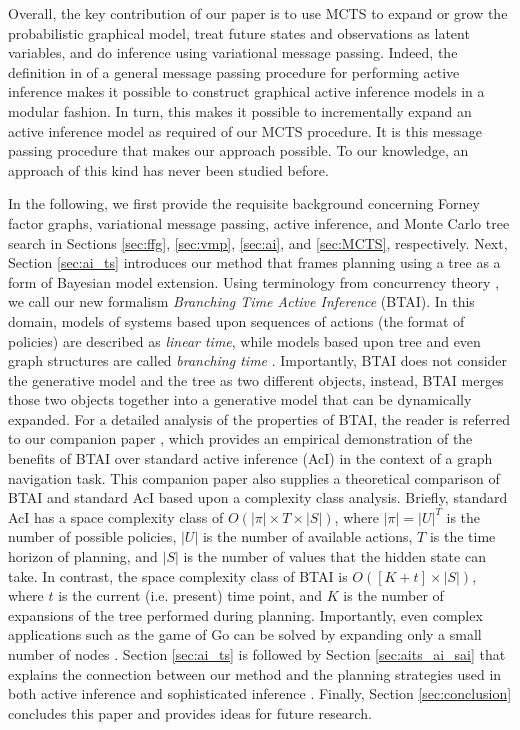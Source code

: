 \documentclass[twoside,11pt]{article}
\begin{document}
Overall, the key contribution of our paper is to use MCTS to expand or grow the probabilistic graphical model, treat future states and observations as latent variables, and do inference using variational message passing. Indeed, the definition in \citep{AI_VMP} of a general message passing procedure for performing active inference makes it possible to construct graphical active inference models in a modular fashion. In turn, this makes it possible to incrementally expand an active inference model as required of our MCTS procedure. It is this message passing procedure that makes our approach possible. To our knowledge, an approach of this kind has never been studied before.

In the following, we first provide the requisite background concerning Forney factor graphs, variational message passing, active inference, and Monte Carlo tree search in Sections \ref{sec:ffg}, \ref{sec:vmp}, \ref{sec:ai}, and \ref{sec:MCTS}, respectively. Next, Section \ref{sec:ai_ts} introduces our method that frames planning using a tree as a form of Bayesian model extension. Using terminology from concurrency theory \citep{concurrency_howard}, we call our new formalism \textit{Branching Time Active Inference} (BTAI). In this domain, models of systems based upon sequences of actions (the format of policies) are described as \textit{linear time}, while models based upon tree and even graph structures are called \textit{branching time} \citep{concurrency_glabbeek,concurrency_glabbeek_2,concurrency_howard}. Importantly, BTAI does not consider the generative model and the tree as two different objects, instead, BTAI merges those two objects together into a generative model that can be dynamically expanded. For a detailed analysis of the properties of BTAI, the reader is referred to our companion paper \citep{AITS_PRACTICE}, which provides an empirical demonstration of the benefits of BTAI over standard active inference (AcI) in the context of a graph navigation task. This companion paper also supplies a theoretical comparison of BTAI and standard AcI based upon a complexity class analysis. Briefly, standard AcI has a space complexity class of $O(|\pi| \times T \times |S|)$, where $|\pi| = |U|^T$ is the number of possible policies, $|U|$ is the number of available actions, $T$ is the time horizon of planning, and $|S|$ is the number of values that the hidden state can take. In contrast, the space complexity class of BTAI is $O([K + t] \times |S|)$, where $t$ is the current (i.e. present) time point, and $K$ is the number of expansions of the tree performed during planning. Importantly, even complex applications such as the game of Go can be solved by expanding only a small number of nodes \citep{Go,MuZero}. Section \ref{sec:ai_ts} is followed by Section \ref{sec:aits_ai_sai} that explains the connection between our method and the planning strategies used in both active inference and sophisticated inference \citep{Sophisticated_INF}. Finally, Section \ref{sec:conclusion} concludes this paper and provides ideas for future research.
\end{document}
